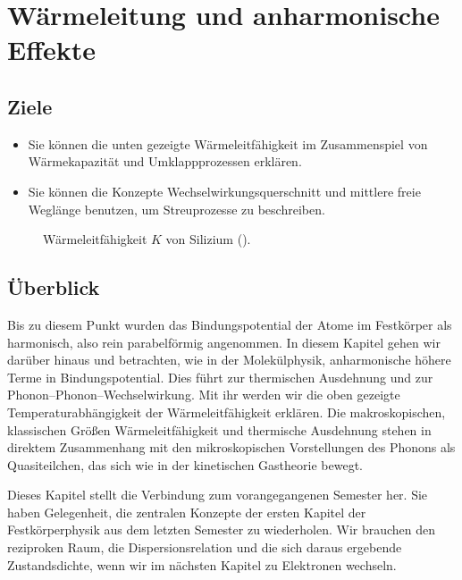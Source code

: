\renewcommand{\chapterauthors}{Markus Lippitz}
\renewcommand{\lastmod}{18. März 2025}

\chapter{Wärmeleitung und anharmonische Effekte}




\section{Ziele}
 


\begin{itemize}
\item Sie können die unten gezeigte Wärmeleitfähigkeit im Zusammenspiel von Wärmekapazität und Umklappprozessen erklären.
\item Sie können die Konzepte Wechselwirkungsquerschnitt und mittlere freie Weglänge benutzen, um Streuprozesse zu beschreiben.

\end{itemize}


\begin{figure}
    \caption{Wärmeleitfähigkeit $K$  von Silizium (\cite{Glassbrenner1964}).}
    \label{fig:1_WL_Si}
\end{figure}
 

\section{Überblick}

Bis zu diesem Punkt wurden das Bindungspotential der Atome im Festkörper als harmonisch, also rein parabelförmig angenommen. In diesem Kapitel gehen wir darüber hinaus und betrachten, wie in der Molekülphysik, anharmonische höhere Terme in Bindungspotential. Dies führt zur thermischen Ausdehnung und zur  Phonon--Phonon--Wechselwirkung. Mit ihr werden wir die oben gezeigte Temperaturabhängigkeit der Wärmeleitfähigkeit erklären.  Die makroskopischen, klassischen Größen Wärmeleitfähigkeit und thermische Ausdehnung stehen in direktem Zusammenhang mit den mikroskopischen Vorstellungen des Phonons als Quasiteilchen, das sich wie in der kinetischen Gastheorie bewegt.

Dieses Kapitel stellt die Verbindung zum vorangegangenen Semester her. Sie haben Gelegenheit, die zentralen Konzepte der ersten Kapitel der Festkörperphysik aus dem letzten Semester zu wiederholen. Wir brauchen den reziproken Raum, die Dispersionsrelation und die sich daraus ergebende Zustandsdichte, wenn wir im nächsten Kapitel zu Elektronen wechseln.


